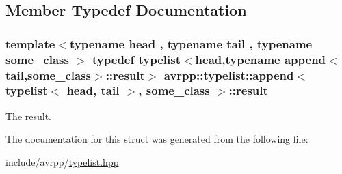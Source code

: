 \subsection{Member Typedef Documentation}
\hypertarget{structavrpp_1_1typelist_1_1append_3_01typelist_3_01head_00_01tail_01_4_00_01some__class_01_4_afda2a6125cd10bf944aeb1c3f5d9e969}{
\subsubsection[{result}]{\setlength{\rightskip}{0pt plus 5cm}template$<$typename head , typename tail , typename some\_\-class $>$ typedef {\bf typelist}$<$head,typename append$<$tail,some\_\-class$>$::{\bf result}$>$ avrpp::typelist::append$<$ {\bf typelist}$<$ head, tail $>$, some\_\-class $>$::{\bf result}}}
\label{structavrpp_1_1typelist_1_1append_3_01typelist_3_01head_00_01tail_01_4_00_01some__class_01_4_afda2a6125cd10bf944aeb1c3f5d9e969}


The result. 



The documentation for this struct was generated from the following file:\begin{DoxyCompactItemize}
\item 
include/avrpp/\hyperlink{typelist_8hpp}{typelist.hpp}\end{DoxyCompactItemize}
